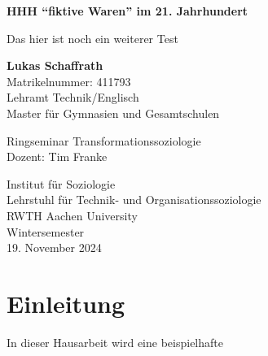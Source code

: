 \documentclass[12pt]{article}
\begin{document}
\begin{titlepage}
    \begin{center}
        \vspace*{0.5cm}
            
        \LARGE
        \textbf{HHH \enquote{fiktive Waren} im 21. Jahrhundert}
            
        \vspace{0.2cm}
        \Large
        Das hier ist noch ein weiterer Test\\

            
        \vspace{2cm}
            
        \textbf{Lukas Schaffrath}\\
        Matrikelnummer: 411793\\
        Lehramt Technik/Englisch\\
        Master für Gymnasien und Gesamtschulen
            
        \vspace{2cm}
            
        Ringseminar Transformationssoziologie\\
        Dozent: Tim Franke
            
        \vspace{2cm}
            
            
        \Large
        Institut für Soziologie\\
        Lehrstuhl für Technik- und Organisationssoziologie\\
        RWTH Aachen University\\
        Wintersemester\\
        19. November 2024
            
    \end{center}
\end{titlepage}




\newpage
\setcounter{page}{1}
\pagestyle{maintext}

\section{Einleitung}
In dieser Hausarbeit wird eine beispielhafte 
\end{document}
